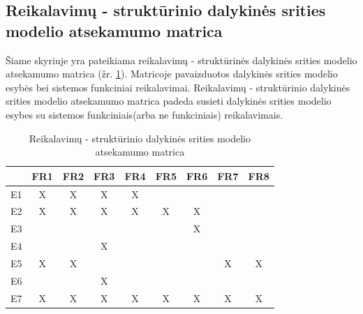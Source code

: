 \documentclass{VUMIFPSkursinis}
\begin{document}
            \subsection{Reikalavimų - struktūrinio dalykinės srities modelio atsekamumo matrica}
            Šiame skyriuje yra pateikiama reikalavimų - struktūrinės dalykinės srities modelio atsekamumo matrica (žr. \ref{Reikalavimų - struktūrinio dalykinės srities modelio atsekamumo matrica}). Matricoje pavaizduotos dalykinės srities modelio esybės bei sistemos funkciniai reikalavimai. Reikalavimų - struktūrinio dalykinės srities modelio atsekamumo matrica padeda susieti dalykinės srities modelio esybes su sistemos funkciniais(arba ne funkciniais) reikalavimais.
            \begin{table}[H]\footnotesize
                \centering
                \caption{Reikalavimų - struktūrinio dalykinės srities modelio atsekamumo matrica}
                {
                    \begin{tabular}{|c|c|c|c|c|c|c|c|c| }
                    \hline
                          & FR1  & FR2 & FR3 & FR4 & FR5 & FR6 & FR7 & FR8 \\ 
                    \hline
                        E1 & X   & X   & X   & X   &     &     &     &      \\  
                    \hline
                        E2 & X   & X   & X   & X   & X   & X   &     &      \\ 
                    \hline
                        E3 &     &     &     &     &     & X   &     &      \\ 
                    \hline
                        E4 &     &     & X   &     &     &     &     &      \\ 
                    \hline
                        E5 & X   & X   &     &     &     &     & X   & X    \\ 
                    \hline
                        E6 &     &     & X   &     &     &     &     &      \\ 
                    \hline
                        E7 & X   & X   & X   & X   & X   & X   & X   & X    \\ 
                    \hline 
                    \end{tabular}
                }
                \label{Reikalavimų - struktūrinio dalykinės srities modelio atsekamumo matrica}
            \end{table}
      
\end{document}
